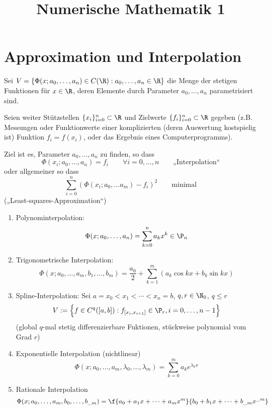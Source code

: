 \documentclass[11pt]{scrbook}
\title{Numerische Mathematik 1}
\author{}
\begin{document}
\maketitle

\tableofcontents
\newpage

\chapter{Approximation und Interpolation}

Sei $V= \{\Phi(x;a_0,\dotsc, a_n) \in C(\R) : a_0,\dotsc,a_n\in \R\}$ die Menge der stetigen Funktionen für $x\in \R$, deren Elemente durch Parameter $a_0,\dotsc,a_n$ parametrisiert sind.

Seien weiter Stützstellen $\{x_i\}_{i=0}^n\subset \R$ und Zielwerte $\{f_i\}_{i=0}^n \subset \R$ gegeben (z.B. Messungen oder Funktionwerte einer komplizierten (deren Auswertung kostspielig ist) Funktion $f_i=f(x_i)$, oder das Ergebnis eines Computerprogramms).

Ziel ist es, Parameter $a_0,\dotsc, a_n$ zu finden, so dass
\[
	\Phi(x_i;a_0,\dotsc, a_n) = f_i \qquad \forall i= 0,\dotsc,n \qquad \text{„Interpolation“}
\]
oder allgemeiner so dass
\[
	\sum_{i=0}^n(\Phi(x_i; a_0,\dotsc a_m) -f_i)^2 \qquad \text{minimal}
\]
(„Least-squares-Approximation“)

\begin{ex*}
	\begin{enumerate}
		\item 
			Polynominterpolation:
			\[
				\Phi(x; a_0,\dotsc, a_n) = \sum_{k=0}^na_kx^k \in \P_n
			\]
		\item
			Trigonometrische Interpolation:
			\[
				\Phi ( x;a_0,\dots,a_m,b_1,\dots, b_m ) = \frac{a_{0}}{2} + \sum_{k=1}^m ( a_k \cos kx + b_k \sin kx )
			\]
		\item
			Spline-Interpolation:
			Sei $a=x_0< x_1 < \dotsb < x_n = b$, $q,r\in \N_0$, $q\le r$
			\[
			V := \Big\{ f\in C^q([a,b]) : f_{[x_i,x_{i+1}]}\in \P_r, i=0,\dotsc,n-1 \Big\}
			\]
			(global $q$-mal stetig differenzierbare Fuktionen, stückweise polynomial vom Grad $r$)
		\item
			Exponentielle Interpolation (nichtlinear)
			\[
			\Phi(x;a_0,\dotsc, a_m,\lambda_0,\dotsc, \lambda_m) = \sum_{k=0}^m a_ke^{\lambda_k x}
			\]
		\item
			Rationale Interpolation
			\[
				\Phi(x; a_0,\dotsc, a_m, b_0,\dotsc, b_{\_m}) = \f {a_0 + a_1x + \dotsb + a_m x^m}{b_0 + b_1x + \dotsb + b_{\_m}x^{\_m}}
			\]
	\end{enumerate}
\end{ex*}
\end{document}
